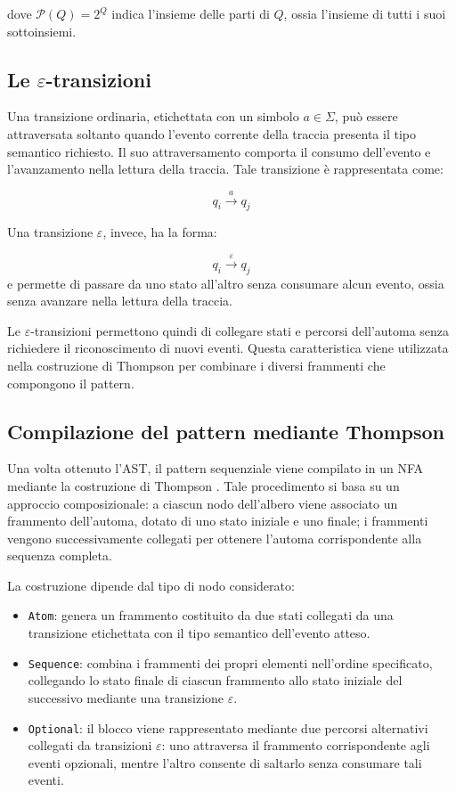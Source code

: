 dove \(\mathcal{P}(Q) = 2^{Q}\) indica l'insieme delle parti di \(Q\), ossia l'insieme di tutti i suoi sottoinsiemi.



\subsection{\texorpdfstring{Le \(\varepsilon\)-transizioni}{Le \textbackslash varepsilon-transizioni}}\label{le-varepsilon-transizioni}

Una transizione ordinaria, etichettata con un simbolo \(a \in \Sigma\), può essere attraversata soltanto quando l'evento corrente della traccia presenta il tipo semantico richiesto. Il suo attraversamento comporta il consumo dell'evento e l'avanzamento nella lettura della traccia. Tale transizione è rappresentata come:

\[
q_{i} \xrightarrow{a} q_{j}
\]

Una transizione \(\varepsilon\), invece, ha la forma:

\[
q_{i} \xrightarrow{\varepsilon} q_{j}
\] e permette di passare da uno stato all'altro senza consumare alcun evento, ossia senza avanzare nella lettura della traccia.

Le \(\varepsilon\)-transizioni permettono quindi di collegare stati e percorsi dell'automa senza richiedere il riconoscimento di nuovi eventi. Questa caratteristica viene utilizzata nella costruzione di Thompson per combinare i diversi frammenti che compongono il pattern. 

\subsection{Compilazione del pattern mediante Thompson}\label{compilazione-del-pattern-mediante-thompson}

Una volta ottenuto l'AST, il pattern sequenziale viene compilato in un NFA mediante la costruzione di Thompson \cite{thompson_1968}. Tale procedimento si basa su un approccio composizionale: a ciascun nodo dell'albero viene associato un frammento dell'automa, dotato di uno stato iniziale e uno finale; i frammenti vengono successivamente collegati per ottenere l'automa corrispondente alla sequenza completa.

La costruzione dipende dal tipo di nodo considerato:

\begin{itemize}
\tightlist
\item
  \texttt{Atom}: genera un frammento costituito da due stati collegati da una transizione etichettata con il tipo semantico dell'evento atteso.
\item
  \texttt{Sequence}: combina i frammenti dei propri elementi nell'ordine specificato, collegando lo stato finale di ciascun frammento allo stato iniziale del successivo mediante una transizione \(\varepsilon\).
\item
  \texttt{Optional}: il blocco viene rappresentato mediante due percorsi alternativi collegati da transizioni \(\varepsilon\): uno attraversa il frammento corrispondente agli eventi opzionali, mentre l'altro consente di saltarlo senza consumare tali eventi.
\end{itemize}

